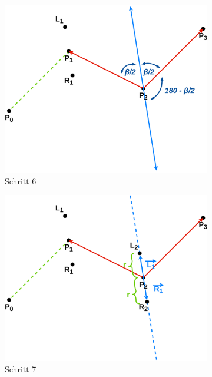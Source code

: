 \documentclass[doktyp=studarbeit]{TUBAFarbeiten}
\begin{document}
\begin{figure}[!htb]
\begin{subfigure}[b]{0.45\textwidth}
        \includegraphics[width=1\linewidth]{Schlangenlinie-6.png}
        \caption{Schritt 6}
    \end{subfigure}
    \qquad
    \begin{subfigure}[b]{0.45\textwidth}
        \centering
        \includegraphics[width=1\linewidth]{Schlangenlinie-7.png}
        \caption{Schritt 7}
    \end{subfigure}
    \qquad
    \begin{subfigure}[b]{0.45\textwidth}
        \centering

\end{subfigure}
\end{figure}
\end{document}
